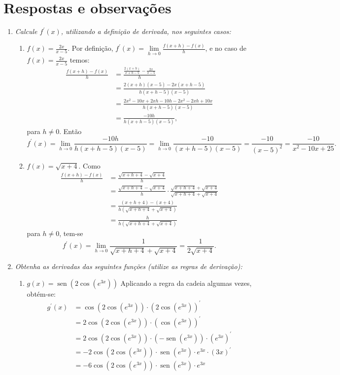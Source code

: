 \documentclass[12pt,a4paper]{article}
\begin{document}
\newpage
\restoregeometry
\section*{Respostas e observações}

\begin{enumerate}
\item \textit{ Calcule $f^\prime(x)$, utilizando a definição de derivada, nos seguintes casos:
}
\begin{enumerate}
\item $f(x) = \frac{2x}{x-5}$. Por definição, $f^\prime(x) = \lim\limits_{h \to 0} \frac{f(x+h) - f(x)}{h}$, e no caso de $f(x) = \frac{2x}{x-5}$ temos:
\begin{align*}
  \frac{f(x+h) - f(x)}{h}
& = \frac{\frac{2(x+h)}{x+h-5} - \frac{2x}{x-5}}{h} \\
& = \frac{2(x+h)(x-5) - 2x(x+h-5)}{h(x+h-5)(x-5)} \\
& = \frac{2x^2 - 10x + 2xh -10h - 2x^2 - 2xh + 10x}{h(x+h-5)(x-5)} \\
& = \frac{-10h}{h(x+h-5)(x-5)},
\end{align*}
para $h \not=0$. Então
\[
f^\prime(x)
= \lim\limits_{h \to 0} \frac{-10h}{h(x+h-5)(x-5)}
= \lim\limits_{h \to 0} \frac{-10}{(x+h-5)(x-5)}
= \frac{-10}{(x-5)^2}
= \frac{-10}{x^2-10x + 25}.
\]

\item $f(x) = \sqrt{x+4}$. Como
\begin{align*}
  \frac{f(x+h) - f(x)}{h}
& = \frac{\sqrt{x+h+4} - \sqrt{x+4}}{h} \\
& = \frac{\sqrt{x+h+4} - \sqrt{x+4}}{h} \cdot
    \frac{\sqrt{x+h+4} + \sqrt{x+4}}
         {\sqrt{x+h+4} + \sqrt{x+4}} \\
& = \frac{(x+h+4) - (x+4)}
         {h(\sqrt{x+h+4} + \sqrt{x+4})} \\
& = \frac{h}
         {h(\sqrt{x+h+4} + \sqrt{x+4})}
\end{align*}
para $h \not=0$, tem-se
\[
f^\prime(x)
= \lim\limits_{h \to 0}
  \frac{1}
       {\sqrt{x+h+4} + \sqrt{x+4}}
= \frac{1}
       {2 \sqrt{x+4}}.
\]
\end{enumerate}

\item \textit{ Obtenha as derivadas das seguintes funções (utilize as regras de derivação):}
\begin{enumerate}
\item $g(x) = \operatorname{sen}{ ( 2 \cos( e^{3x} ) ) }$
Aplicando a regra da cadeia algumas vezes, obtém-se:
\begin{align*}
  g^\prime(x)
& = \cos{ ( 2 \cos( e^{3x} ) ) } \cdot ( 2 \cos( e^{3x} ) )^\prime \\
& = 2 \cos{ ( 2 \cos( e^{3x} ) ) } \cdot ( \cos( e^{3x} ) )^\prime \\
& = 2 \cos{ ( 2 \cos( e^{3x} ) ) } \cdot ( -\operatorname{sen}( e^{3x} ) ) \cdot ( e^{3x} )^\prime \\
& = -2 \cos{ ( 2 \cos( e^{3x} ) ) } \cdot \operatorname{sen}( e^{3x} ) \cdot e^{3x} \cdot (3x)^\prime \\
& = -6 \cos{ ( 2 \cos( e^{3x} ) ) } \cdot \operatorname{sen}( e^{3x} ) \cdot e^{3x}
\end{align*}


\end{enumerate}
\end{enumerate}
\end{document}
